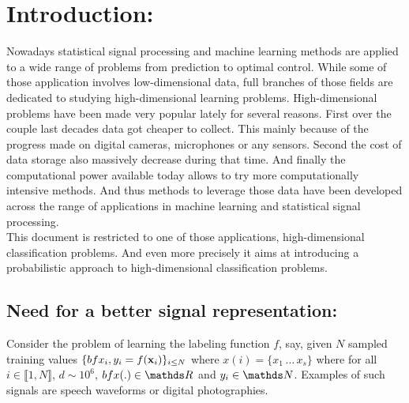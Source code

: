 \documentclass[a4paper,11pt]{report}
\begin{document}
	\vfill	
		
	\newpage
	\thispagestyle{empty}
	\mbox{}
 
	\setcounter{tocdepth}{3}
	\renewcommand{\contentsname}{Contents:}
	\tableofcontents
	\clearpage

	\renewcommand{\listfigurename}{List of figures:}
	\listoffigures

\chapter{Introduction:}
	\label{chap:Intro}
	
	Nowadays statistical signal processing and machine learning methods are applied to a wide range of problems from prediction to optimal control. While some of those application involves low-dimensional data, full branches of those fields are dedicated to studying high-dimensional learning problems. High-dimensional problems have been made very popular lately for several reasons. First over the couple last decades data got cheaper to collect. This mainly because of the progress made on digital cameras, microphones or any sensors. Second the cost of data storage also massively decrease during that time. And finally the computational power available today allows to try more computationally intensive methods. And thus methods to leverage those data have been developed across the range of applications in machine learning and statistical signal processing.\\
	
	This document is restricted to one of those applications, high-dimensional classification problems. And even more precisely it aims at introducing a probabilistic approach to high-dimensional classification problems.
		   
	\section{Need for a better signal representation:}
		\label{sec:Intro/Need}
		
		Consider the problem of learning the labeling function $f$, say, given $N$ sampled training values $\{bfx_{i}, y_{i}=f({\bf x}_{i})\}_{i\leq N}$ where $x(i) =\{x_{1} \, \dots \, x_{s}\}$ where for all $i \in \llbracket 1 , N \rrbracket$, $d \sim 10^{6}$, $bfx(.) \in \dsR$ and $y_{i} \in \dsN$. Examples of such signals are speech waveforms or digital photographies.  
\end{document}
